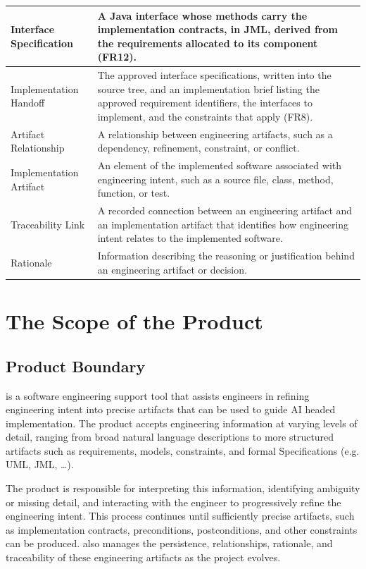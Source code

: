 \documentclass[12pt]{article}
\begin{document}
\begin{longtable}{|p{3.6cm}|p{9.2cm}|}
Interface Specification &
A Java interface whose methods carry the implementation contracts, in JML,
derived from the requirements allocated to its component (FR12). \\
\hline

Implementation Handoff &
The approved interface specifications, written into the source tree, and an
implementation brief listing the approved requirement identifiers, the
interfaces to implement, and the constraints that apply (FR8). \\
\hline

Artifact Relationship &
A relationship between engineering artifacts, such as a dependency, refinement,
constraint, or conflict. \\
\hline

Implementation Artifact &
An element of the implemented software associated with engineering intent, such
as a source file, class, method, function, or test. \\
\hline

Traceability Link &
A recorded connection between an engineering artifact and an implementation
artifact that identifies how engineering intent relates to the implemented
software. \\
\hline

Rationale &
Information describing the reasoning or justification behind an engineering
artifact or decision. \\
\hline
\end{longtable}

\section{The Scope of the Product}
\subsection{Product Boundary}

\progname{} is a software engineering support tool that assists engineers in
refining engineering intent into precise artifacts that can be used to guide
AI headed implementation. The product accepts engineering information at
varying levels of detail, ranging from broad natural language descriptions to
more structured artifacts such as requirements, models, constraints, and formal
Specifications (e.g. UML, JML, …).

The product is responsible for interpreting this information, identifying
ambiguity or missing detail, and interacting with the engineer to progressively
refine the engineering intent. This process continues until sufficiently precise
artifacts, such as implementation contracts, preconditions, postconditions, and
other constraints can be produced. \progname{} also manages the persistence,
relationships, rationale, and traceability of these engineering artifacts as the
project evolves.
\end{document}
